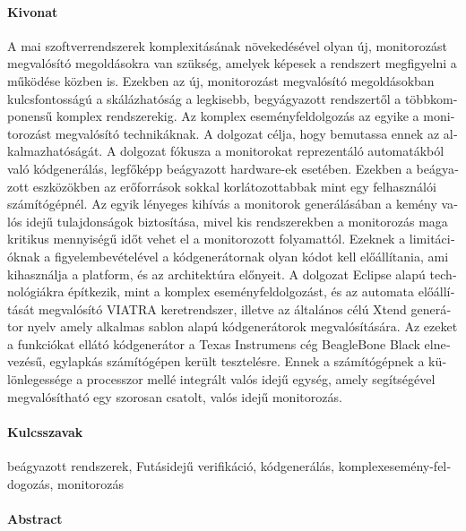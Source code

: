 \begin{otherlanguage}{magyar}
\paragraph*{Kivonat}
\thispagestyle{plain}

A mai szoftverrendszerek komplexitásának növekedésével olyan új, monitorozást megvalósító megoldásokra van szükség, amelyek képesek a rendszert megfigyelni  a működése közben is. Ezekben az új, monitorozást megvalósító megoldásokban kulcsfontosságú a skálázhatóság a legkisebb, begyágyazott rendszertől a többkomponensű komplex rendszerekig. Az komplex eseményfeldolgozás az egyike a monitorozást megvalósító technikáknak. A dolgozat célja, hogy bemutassa ennek az alkalmazhatóságát.
A dolgozat fókusza a monitorokat reprezentáló automatákból való kódgenerálás, legfőképp beágyazott hardware-ek esetében. Ezekben a beágyazott eszközökben az erőforrások sokkal korlátozottabbak mint egy felhasználói számítógépnél. Az egyik lényeges kihívás a monitorok generálásában a kemény valós idejű tulajdonságok biztosítása, mivel kis rendszerekben a monitorozás maga kritikus mennyiségű időt vehet el a monitorozott folyamattól. Ezeknek a limitációknak a figyelembevételével a kódgenerátornak olyan kódot kell előállítania, ami kihasználja a platform, és az architektúra előnyeit.
A dolgozat Eclipse alapú technológiákra építkezik, mint a komplex eseményfeldolgozást, és az automata előállítását megvalósító VIATRA keretrendszer, illetve az általános célú Xtend generátor nyelv amely alkalmas sablon alapú kódgenerátorok megvalósítására.
Az ezeket a funkciókat ellátó kódgenerátor a Texas Instrumens cég BeagleBone Black elnevezésű, egylapkás számítógépen került tesztelésre. Ennek a számítógépnek a különlegessége a processzor mellé integrált valós idejű egység, amely segítségével megvalósítható egy szorosan csatolt, valós idejű monitorozás.

\paragraph{Kulcsszavak} beágyazott rendszerek, Futásidejű verifikáció, kódgenerálás, komplexesemény-feldogozás, monitorozás
\end{otherlanguage}

\cleardoublepage{}

\paragraph*{Abstract}
\thispagestyle{plain}

